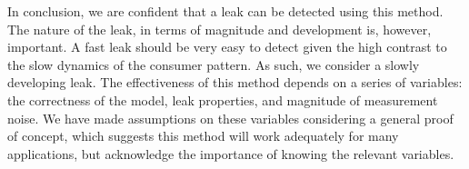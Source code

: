 In conclusion, we are confident that a leak can be detected using this method. The nature of the leak, in terms of magnitude and development is, however, important. A fast leak should be very easy to detect given the high contrast to the slow dynamics of the consumer pattern. As such, we consider a slowly developing leak. The effectiveness of this method depends on a series of variables: the correctness of the model, leak properties, and magnitude of measurement noise. We have made assumptions on these variables considering a general proof of concept, which suggests this method will work adequately for many applications, but acknowledge the importance of knowing the relevant variables.